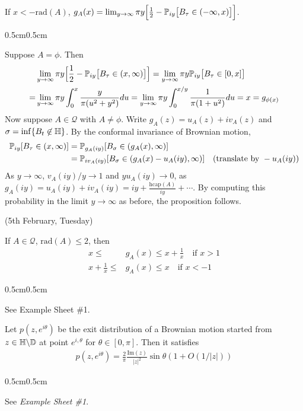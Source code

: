 \documentclass[12pt,a4paper]{article}
\newenvironment{proof}
{\begin{changemargin}{0.5cm}{0.5cm} 
	}%
	{\end{changemargin}
}
\newenvironment{p}
{\begin{proof} 
	}%
	{\end{proof}
}
\begin{document}
\quad If $x< -\text{rad}(A)$, $g_A(x) = \lim_{y\rightarrow \infty} \pi y \Big[ \frac{1}{2} - \mathbb{P}_{iy} \big[ B_{\tau} \in (-\infty, x) \big] \Big]$.
\begin{p}


\pf Suppose $A= \phi$. Then
\begin{align*}
& \lim_{y\rightarrow \infty} \pi y \Big[ \frac{1}{2} - \mathbb{P}_{iy} \big[ B_{\tau} \in (x, \infty) \big] \Big] = \lim_{y\rightarrow \infty} \pi y \mathbb{P}_{iy} \big[ B_{\tau} \in [0,x] \big] \\
=& \lim_{y\rightarrow \infty} \pi y \int_0^x \frac{y}{\pi (u^2 + y^2)} du = \lim_{y\rightarrow \infty} \pi y \int_0^{x/y} \frac{1}{\pi(1+ u^2)} du =x = g_{\phi(x)}
\end{align*}
Now suppose $A\in \mathscr{Q}$ with $A \neq\phi$. Write $g_A(z) = u_A(z) + iv_A(z)$ and $\sigma  = \inf \{B_t \not\in \mathbb{H} \}$. By the conformal invariance of Brownian motion, 
\begin{align*}
\mathbb{P}_{iy} [B_{\tau} \in (x,\infty)] &= \mathbb{P}_{g_A(iy)} [B_{\sigma} \in (g_A(x) , \infty)] \\
&= \mathbb{P}_{iv_A(iy)} [B_{\sigma} \in (g_A(x) - u_A(iy), \infty)] \quad (\text{translate by }-u_A(iy))
\end{align*}
As $y\rightarrow \infty$, $v_A(iy) / y \rightarrow 1$ and $yu_A(iy) \rightarrow 0$, as $g_A(iy) = u_A(iy) + i v_A(iy) = iy + \frac{\text{hcap}(A)}{iy} + \cdots$. By computing this probability in the limit $y\rightarrow \infty$ as before, the proposition follows.

\eop
\end{p}
\s

\newday

(5th February, Tuesday)
\s

\corr If $A\in \mathscr{Q}$, $\text{rad}(A)\leq 2$, then 
\begin{align*}
x\leq & g_A(x) \leq x + \frac{1}{x} \quad \text{if } x>1 \\
x+ \frac{1}{x} \leq & g_A(x) \leq x \quad \text{if } x<-1
\end{align*}
\begin{p}
\pf See Example Sheet \#1.
\end{p}
\s

\lem Let $p(z,e^{i\theta})$ be the exit distribution of a Brownian motion started from $z \in \mathbb{H} \backslash \mathbb{D}$ at point $e^{i, \theta}$ for $\theta \in [0, \pi ]$. Then it satisfies
\begin{align*}
p(z, e^{i\theta}) = \frac{2}{\pi} \frac{\text{Im}(z)}{|z|^2} \sin \theta (1+ O(1/|z|))
\end{align*}
\begin{p}
\pf See \emph{Example Sheet \#1}.
\end{p}
\end{document}
